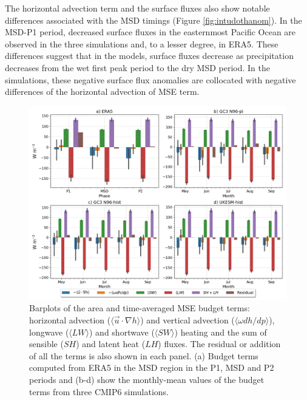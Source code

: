 The horizontal advection term and the surface fluxes also show notable differences associated with the MSD timings (Figure \ref{fig:intudothanom}). In the MSD-P1 period, decreased surface fluxes in the easternmost Pacific Ocean are observed in the three simulations and, to a lesser degree, in ERA5. These differences suggest that in the models, surface fluxes decrease as precipitation decreases from the wet first peak period to the dry MSD period. In the simulations, these negative surface flux anomalies are collocated with negative differences of the horizontal advection of MSE term. 



\begin{figure}[t!]
\includegraphics[width=\linewidth]{figures/mse_barplot_era5}
\caption[Barplots of MSE budget terms]{Barplots of the area and time-averaged MSE budget terms: horizontal advection ($\langle \vec{u}\cdot\nabla h \rangle$) and vertical advection ($\langle \omega dh/dp \rangle$), longwave ($\langle LW \rangle$) and shortwave ($\langle SW \rangle$) heating and the sum of sensible ($SH$) and latent heat ($LH$) fluxes. The residual or addition of all the terms is also shown in each panel. (a) Budget terms computed from ERA5 in the MSD region in the P1, MSD and P2 periods and (b-d) show the monthly-mean values of the budget terms from three CMIP6 simulations. }
\label{fig:thermo_barplot}
\end{figure}

